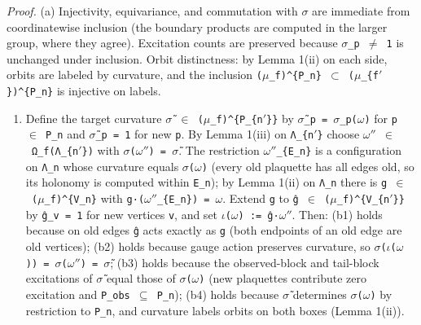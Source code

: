 \documentclass[
  american,
  11pt,
  letterpaper,
]{article}
\providecommand{\tightlist}{%
  \setlength{\itemsep}{0pt}\setlength{\parskip}{0pt}}
\begin{document}
\emph{Proof.} (a) Injectivity, equivariance, and commutation with \texttt{\ensuremath{\sigma}} are immediate from coordinatewise inclusion (the boundary products are computed in the larger group, where they agree). Excitation counts are preserved because \texttt{\ensuremath{\sigma}\_p\ \ensuremath{\neq}\ 1} is unchanged under inclusion. Orbit distinctness: by Lemma 1(ii) on each side, orbits are labeled by curvature, and the inclusion \texttt{(\ensuremath{\mu}\_f)\^{}\{P\_n\}\ \ensuremath{\subset}\ (\ensuremath{\mu}\_\{f\ensuremath{'}\})\^{}\{P\_n\}} is injective on labels.

\begin{enumerate}
\def\labelenumi{(\alph{enumi})}
\setcounter{enumi}{1}
\tightlist
\item
  Define the target curvature \texttt{\ensuremath{\sigma}̃\ \ensuremath{\in}\ (\ensuremath{\mu}\_f)\^{}\{P\_\{n\ensuremath{'}\}\}} by \texttt{\ensuremath{\sigma}̃\_p\ =\ \ensuremath{\sigma}\_p(\ensuremath{\omega})} for \texttt{p\ \ensuremath{\in}\ P\_n} and \texttt{\ensuremath{\sigma}̃\_p\ =\ 1} for new \texttt{p}. By Lemma 1(iii) on \texttt{Λ\_\{n\ensuremath{'}\}} choose \texttt{\ensuremath{\omega}\ensuremath{''}\ \ensuremath{\in}\ Ω\_f(Λ\_\{n\ensuremath{'}\})} with \texttt{\ensuremath{\sigma}(\ensuremath{\omega}\ensuremath{''})\ =\ \ensuremath{\sigma}̃}. The restriction \texttt{\ensuremath{\omega}\ensuremath{''}\textbar{}\_\{E\_n\}} is a configuration on \texttt{Λ\_n} whose curvature equals \texttt{\ensuremath{\sigma}(\ensuremath{\omega})} (every old plaquette has all edges old, so its holonomy is computed within \texttt{E\_n}); by Lemma 1(ii) on \texttt{Λ\_n} there is \texttt{g\ \ensuremath{\in}\ (\ensuremath{\mu}\_f)\^{}\{V\_n\}} with \texttt{g·(\ensuremath{\omega}\ensuremath{''}\textbar{}\_\{E\_n\})\ =\ \ensuremath{\omega}}. Extend \texttt{g} to \texttt{ĝ\ \ensuremath{\in}\ (\ensuremath{\mu}\_f)\^{}\{V\_\{n\ensuremath{'}\}\}} by \texttt{ĝ\_v\ =\ 1} for new vertices \texttt{v}, and set \texttt{\ensuremath{\iota}(\ensuremath{\omega})\ :=\ ĝ·\ensuremath{\omega}\ensuremath{''}}. Then: (b1) holds because on old edges \texttt{ĝ} acts exactly as \texttt{g} (both endpoints of an old edge are old vertices); (b2) holds because gauge action preserves curvature, so \texttt{\ensuremath{\sigma}(\ensuremath{\iota}(\ensuremath{\omega}))\ =\ \ensuremath{\sigma}(\ensuremath{\omega}\ensuremath{''})\ =\ \ensuremath{\sigma}̃}; (b3) holds because the observed-block and tail-block excitations of \texttt{\ensuremath{\sigma}̃} equal those of \texttt{\ensuremath{\sigma}(\ensuremath{\omega})} (new plaquettes contribute zero excitation and \texttt{P\_obs\ \ensuremath{\subseteq}\ P\_n}); (b4) holds because \texttt{\ensuremath{\sigma}̃} determines \texttt{\ensuremath{\sigma}(\ensuremath{\omega})} by restriction to \texttt{P\_n}, and curvature labels orbits on both boxes (Lemma 1(ii)).
\end{enumerate}
\end{document}
